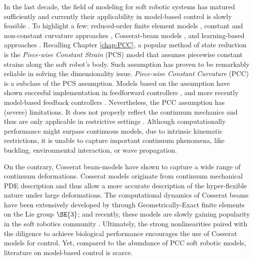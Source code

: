 In the last decade, the field of modeling for soft robotic systems has matured sufficiently and currently their applicability in model-based control is slowly feasible \cite{DellaSantina2021}. To highlight a few: reduced-order finite element models \cite{Duriez2013,Zhang2017,Wu2021}, constant and non-constant curvature approaches \cite{Katzschmann2019,DellaSantina2020}, Cosserat-beam models \cite{Renda2020,Boyer2021}, and learning-based approaches \cite{Bruder2019}. 
\editl Recalling Chapter \ref{chap:PCC}, a popular method of state reduction is the \textit{Piece-wise Constant Strain} (PCS) model that assumes piecewise constant strains along the soft robot's body. Such assumption has proven to be remarkably reliable in solving the dimensionality issue. \textit{Piece-wise Constant Curvature} (PCC) is a subclass of the PCS assumption. Models based on the assumption have shown succesful implementation in feedforward controllers \cite{Falkenhahn2015}, and more recently model-based feedback controllers \cite{DellaSantina2020,Katzschmann2019}. Nevertheless, the PCC assumption has (severe) limitations. It does not properly reflect the continuum mechanics and thus are only applicable in restrictive settings \editr. Although computationally performance might surpass continuous models, due to intrinsic kinematic restrictions, it is unable to capture important continuum phenomena, like buckling, environmental interaction, or wave propagation.

On the contrary, Cosserat beam-models have shown to capture a wide range of continuum deformations. Cosserat models originate from continuum mechanical PDE description and thus allow a more accurate description of the hyper-flexible nature under large deformations. The computational dynamics of Cosserat beams have been extensively developed by \cite{Simo1986} through Geometrically-Exact finite elements on the Lie group $\SE{3}$; and recently, these models are slowly gaining popularity in the soft robotics community \cite{Renda2018,Renda2020,Boyer2021,Till2019,Gazzola2018}. Ultimately, the strong nonlinearities paired with the diligence to achieve biological performance encourages the use of Cosserat models for control. Yet, compared to the abundance of PCC soft robotic models, literature on model-based control is scarce.

